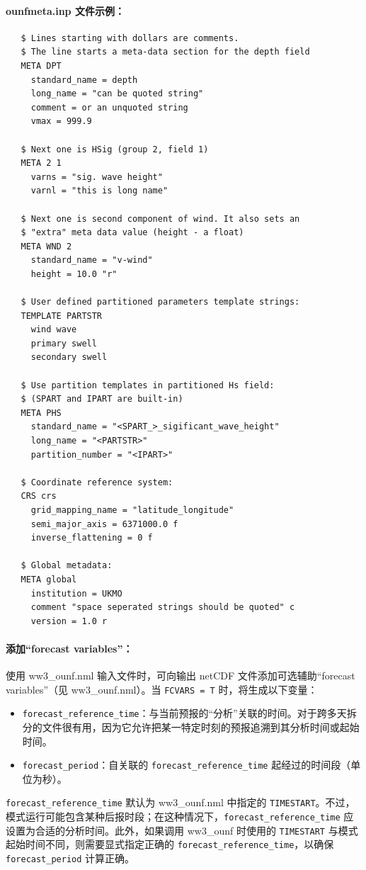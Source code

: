 \noindent
\paragraph{ounfmeta.inp 文件示例：}
\begin{verbatim}
   $ Lines starting with dollars are comments.
   $ The line starts a meta-data section for the depth field
   META DPT
     standard_name = depth
     long_name = "can be quoted string"
     comment = or an unquoted string
     vmax = 999.9

   $ Next one is HSig (group 2, field 1)
   META 2 1
     varns = "sig. wave height"
     varnl = "this is long name"

   $ Next one is second component of wind. It also sets an
   $ "extra" meta data value (height - a float)
   META WND 2
     standard_name = "v-wind"
     height = 10.0 "r"

   $ User defined partitioned parameters template strings:
   TEMPLATE PARTSTR
     wind wave
     primary swell
     secondary swell

   $ Use partition templates in partitioned Hs field:
   $ (SPART and IPART are built-in)
   META PHS
     standard_name = "<SPART_>_sigificant_wave_height"
     long_name = "<PARTSTR>"
     partition_number = "<IPART>"

   $ Coordinate reference system:
   CRS crs
     grid_mapping_name = "latitude_longitude"
     semi_major_axis = 6371000.0 f
     inverse_flattening = 0 f

   $ Global metadata:
   META global
     institution = UKMO
     comment "space seperated strings should be quoted" c
     version = 1.0 r

\end{verbatim}


\noindent
\paragraph{添加“forecast variables”：}
使用 ww3\_ounf.nml 输入文件时，可向输出 netCDF 文件添加可选辅助“forecast variables”（见 ww3\_ounf.nml）。当 \texttt{FCVARS = T} 时，将生成以下变量：
\begin{itemize}
 \item \texttt{forecast\_reference\_time}：与当前预报的“分析”关联的时间。对于跨多天拆分的文件很有用，因为它允许把某一特定时刻的预报追溯到其分析时间或起始时间。
 
 \item \texttt{forecast\_period}：自关联的 \texttt{forecast\_reference\_time} 起经过的时间段（单位为秒）。
\end{itemize}

\noindent
\texttt{forecast\_reference\_time} 默认为 ww3\_ounf.nml 中指定的 \texttt{TIMESTART}。不过，模式运行可能包含某种后报时段；在这种情况下，\texttt{forecast\_reference\_time} 应设置为合适的分析时间。此外，如果调用 ww3\_ounf 时使用的 \texttt{TIMESTART} 与模式起始时间不同，则需要显式指定正确的 \texttt{forecast\_reference\_time}，以确保 \texttt{forecast\_period} 计算正确。

\pb

